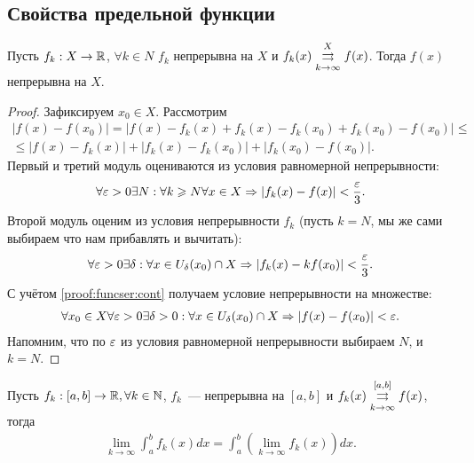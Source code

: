 \documentclass[../main.tex]{subfiles}
\begin{document}
 \subsection{Свойства предельной функции}

 
 \begin{proposition} \label{prop:funcseq:cont}
   Пусть $ f_k: X \to \R$, $ \forall k \in N$ $ f_k $ непрерывна на $ X$ и $ f_k(x) \convergesuniformly{k \to \infty}{X} f(x) $. Тогда $ f(x)$ непрерывна на $ X$. 
 \end{proposition}

 
 \begin{proof}
   Зафиксируем $ x_0 \in X$. Рассмотрим 
   \begin{multline} \label{proof:funcser:cont}
     \left| f(x) - f(x_0 ) \right| = \left| f(x) - f_k(x)  + f_k(x) - f_k (x_0 ) + f_k (x_0 ) - f(x_0) \right| \leq \\ \leq \left| f(x) - f_k(x) \right| + \left| f_k(x) - f_k (x_0 ) \right| + \left| f_k (x_0 ) - f(x_0) \right|   .
   \end{multline}
   Первый и третий модуль оцениваются из условия равномерной непрерывности: 
   \begin{gather} 
     \forall \eps > 0 \exists N: \forall k \geq N \forall x \in X \hence \left| f_k(x)  - f(x)  \right| < \frac{\eps}{3}.
   \end{gather}
   Второй модуль оценим из условия непрерывности $ f_k $ (пусть $ k = N$, мы же сами выбираем что нам прибавлять и вычитать): 
   \begin{gather} 
     \forall \eps > 0 \exists \delta: \forall x \in U_{\delta}(x_0 ) \cap X \hence \left| f_k(x) - kf(x_0 ) \right| < \frac{\eps}{3} .
   \end{gather}
   С учётом \eqref{proof:funcser:cont} получаем условие непрерывности на множестве: 
   \begin{gather} 
    \forall x_0 \in X \forall \eps > 0 \exists \delta > 0 : \forall x \in U_{\delta}(x_0) \cap X \hence \left| f(x) - f(x_0) \right| < \eps .
   \end{gather}
   Напомним, что по $ \eps$ из условия равномерной непрерывности выбираем $ N$, и $ k = N$.
 \end{proof}
 
 
 \begin{proposition} \label{prop:funcseq:changeint}
   Пусть $ f_k : [a, b ] \to \R, \forall k\in \N$, $ f_k $~--- непрерывна на $ [a,b]$ и $ f_k(x) \convergesuniformly{k \to \infty}{[a,b]} f(x)$, тогда 
   \begin{gather} 
     \lim_{k \to \infty} \int_{a}^{b} f_k(x) dx = \int_{a}^{b} \left(  \lim_{k \to \infty} f_k(x)  \right) dx.
   \end{gather}    
 \end{proposition}
 
\end{document}
